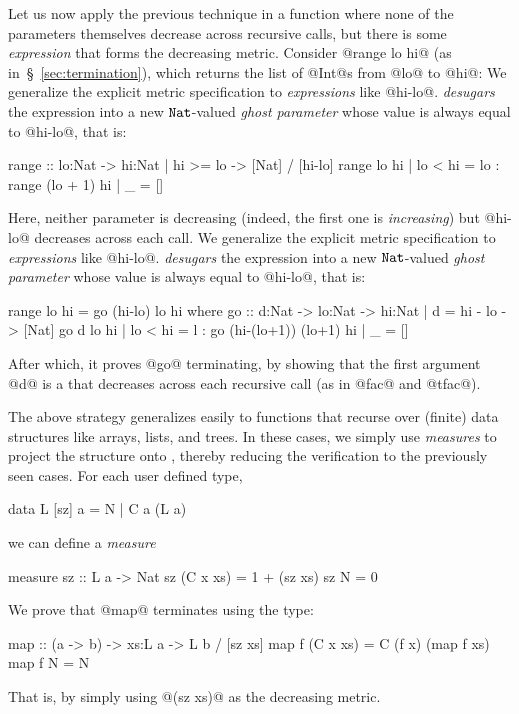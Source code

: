 Let us now apply the previous technique in a function where
none of the parameters themselves decrease across recursive calls,
but there is some \emph{expression} that forms the decreasing metric.
%
%
Consider @range lo hi@ (as in~\S~\ref{sec:termination}), which returns the list of 
@Int@s from @lo@ to @hi@:
%
We generalize the explicit metric specification to 
\emph{expressions} like @hi-lo@. \toolname \emph{desugars} the 
expression into a new $\mathtt{Nat}$-valued \emph{ghost parameter} 
whose value is always equal to @hi-lo@, that is:
\begin{code}
  range :: lo:Nat -> {hi:Nat | hi >= lo} -> [Nat] 
         / [hi-lo]
  range lo hi 
    | lo < hi = lo : range (lo + 1) hi
    | _       = [] 
\end{code}
%
Here, neither parameter is decreasing (indeed, the first one
is \emph{increasing}) but @hi-lo@ decreases across each call. 
%
We generalize the explicit metric specification to 
\emph{expressions} like @hi-lo@. \toolname \emph{desugars} the 
expression into a new $\mathtt{Nat}$-valued \emph{ghost parameter} 
whose value is always equal to @hi-lo@, that is:
%
\begin{code}
  range lo hi = go (hi-lo) lo hi
    where 
      go :: d:Nat -> lo:Nat 
         -> {hi:Nat | d = hi - lo} -> [Nat]
      go d lo hi
       | lo < hi = l : go (hi-(lo+1)) (lo+1) hi 
       | _       = []
\end{code}
%
After which, it proves @go@ terminating, by showing 
that the first argument @d@ is a \tnat that decreases across each 
recursive call (as in @fac@ and @tfac@).

The above strategy generalizes easily to functions that recurse
over (finite) data structures like arrays, lists, and trees.
In these cases, we simply use \emph{measures} to project the 
structure onto \tnat, thereby reducing the verification to 
the previously seen cases. For each user defined type, \eg
%
\begin{code}
  data L [sz] a = N | C a (L a)
\end{code}
%
we can define a \emph{measure}
%
\begin{code}
  measure sz  :: L a -> Nat
    sz (C x xs) = 1 + (sz xs)
    sz N        = 0
\end{code}
%
We prove that @map@ terminates using the type:
%
\begin{code}
  map :: (a -> b) -> xs:L a -> L b / [sz xs]
  map f (C x xs) = C (f x) (map f xs)
  map f N        = N
\end{code}
%
That is, by simply using @(sz xs)@  as the 
decreasing metric.

